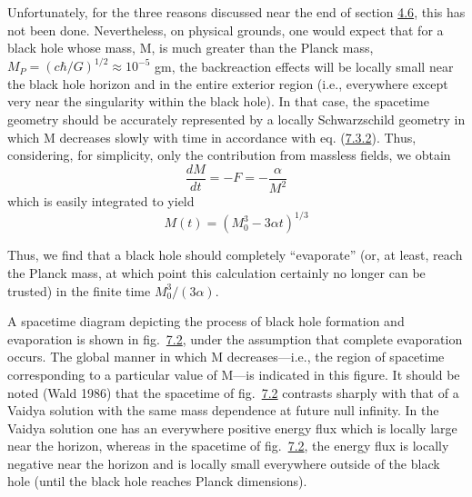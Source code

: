 \documentclass[11pt,a4paper]{article}
\begin{document}
Unfortunately, for the three reasons discussed near the end of section \hyperlink{sec:4.6}{4.6}, this has not been done. Nevertheless, on physical grounds, one would expect that for a black hole whose mass, M, is much greater than the Planck mass, \(M_P = (c\hbar/G)^{1/2} \approx 10^{-5}\) gm, the backreaction effects will be locally small near the black hole horizon and in the entire exterior region (i.e., everywhere except very near \hypertarget{source-190}{} the singularity within the black hole). In that case, the spacetime geometry should be accurately represented by a locally Schwarzschild geometry in which M decreases slowly with time in accordance with eq. (\hyperref[eq:7.3.2]{7.3.2}). Thus, considering, for simplicity, only the contribution from massless fields, we obtain
\begin{equation*}
\frac{dM}{dt} = -F = -\frac{\alpha}{M^2} \tag{7.3.4}\label{eq:7.3.4}
\end{equation*}
which is easily integrated to yield
\begin{equation*}
M(t) = (M_0^3 - 3\alpha t)^{1/3} \tag{7.3.5}\label{eq:7.3.5}
\end{equation*}

Thus, we find that a black hole should completely ``evaporate'' (or, at least, reach the Planck mass, at which point this calculation certainly no longer can be trusted) in the finite time \(M_0^3/(3\alpha)\).

A spacetime diagram depicting the process of black hole formation and evaporation is shown in fig.~\hyperref[fig:7.2]{7.2}, under the assumption that complete evaporation occurs. The global manner in which M decreases---i.e., the region of spacetime corresponding to a particular value of M---is indicated in this figure. It should be noted (Wald 1986) that the spacetime of fig.~\hyperref[fig:7.2]{7.2} contrasts sharply with that of a Vaidya solution with the same mass dependence at future null infinity. In the Vaidya solution one has an everywhere positive energy flux which is locally large near the horizon, whereas in the spacetime of fig.~\hyperref[fig:7.2]{7.2}, the energy flux is locally negative near the horizon and is locally small everywhere outside of the black hole (until the black hole reaches Planck dimensions).
\end{document}
